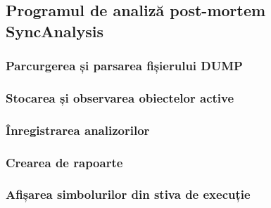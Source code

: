 \subsection{Programul de analiză post-mortem SyncAnalysis}
\label{executable}


\subsubsection{Parcurgerea și parsarea fișierului DUMP}


\subsubsection{Stocarea și observarea obiectelor active}


\subsubsection{Înregistrarea analizorilor}


\subsubsection{Crearea de rapoarte}


\subsubsection{Afișarea simbolurilor din stiva de execuție}
\label{stack-reconstruction}

